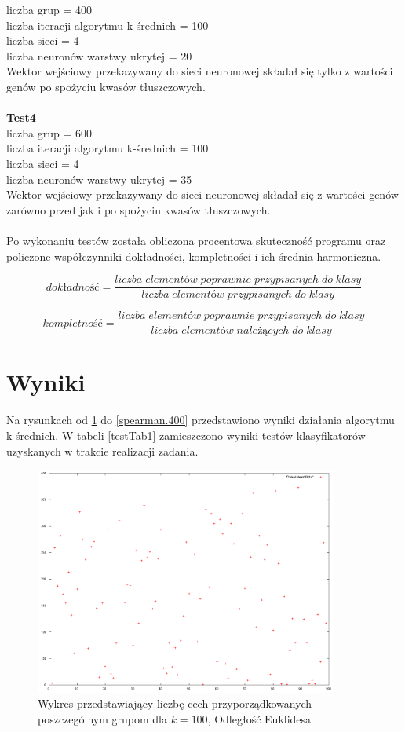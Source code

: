 \documentclass{classrep}
\begin{document}
liczba grup = 400\\
liczba iteracji algorytmu k-średnich = 100\\
liczba sieci = 4\\
liczba neuronów warstwy ukrytej = 20\\
Wektor wejściowy przekazywany do sieci neuronowej składał się tylko z wartości genów po spożyciu kwasów tłuszczowych.\\\\
\textbf{Test4}\\
liczba grup = 600\\
liczba iteracji algorytmu k-średnich = 100\\
liczba sieci = 4\\
liczba neuronów warstwy ukrytej = 35\\
Wektor wejściowy przekazywany do sieci neuronowej składał się z wartości genów zarówno przed jak i po spożyciu kwasów tłuszczowych.\\\\

Po wykonaniu testów została obliczona procentowa skuteczność programu oraz policzone współczynniki dokładności, kompletności i ich średnia harmoniczna.

\begin{equation}
dokładność = \frac{liczba\; elementów\; poprawnie\; przypisanych\; do\; klasy}{liczba\; elementów\; przypisanych\; do\; klasy}
\end{equation}

\begin{equation}
kompletność = \frac{liczba\; elementów\; poprawnie\; przypisanych\; do\; klasy}{liczba\; elementów\; należących\; do\; klasy}
\end{equation}

\section{Wyniki}
Na rysunkach od \ref{euclidean.100} do \ref{spearman.400} przedstawiono wyniki działania algorytmu k-średnich. W tabeli \ref{testTab1} zamieszczono wyniki testów klasyfikatorów uzyskanych w trakcie realizacji zadania.
\begin{figure}
  \centering
  \includegraphics[width=10cm]{img/euclidean100.png}
  \caption{Wykres przedstawiający liczbę cech przyporządkowanych poszczególnym
grupom dla $k=100$, Odległość Euklidesa}
  \label{euclidean.100}
\end{figure}
\end{document}
